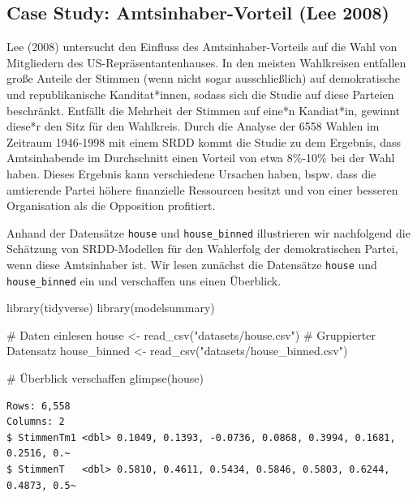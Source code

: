 \documentclass[
  a4paper,
  DIV=11,
  oneside]{scrreprt}
\newenvironment{Shaded}{\begin{snugshade}}{\end{snugshade}}
\newcommand{\CommentTok}[1]{\textcolor[rgb]{0.37,0.37,0.37}{#1}}
\newcommand{\FunctionTok}[1]{\textcolor[rgb]{0.28,0.35,0.67}{#1}}
\newcommand{\NormalTok}[1]{\textcolor[rgb]{0.00,0.23,0.31}{#1}}
\newcommand{\OtherTok}[1]{\textcolor[rgb]{0.00,0.23,0.31}{#1}}
\newcommand{\StringTok}[1]{\textcolor[rgb]{0.13,0.47,0.30}{#1}}
\begin{document}
\hypertarget{case-study-amtsinhaber-vorteil-lee2008}{%
\subsection{Case Study: Amtsinhaber-Vorteil (Lee
2008)}\label{case-study-amtsinhaber-vorteil-lee2008}}

Lee (2008) untersucht den Einfluss des Amtsinhaber-Vorteils auf die Wahl
von Mitgliedern des US-Repräsentantenhauses. In den meisten Wahlkreisen
entfallen große Anteile der Stimmen (wenn nicht sogar ausschließlich)
auf demokratische und republikanische Kanditat*innen, sodass sich die
Studie auf diese Parteien beschränkt. Entfällt die Mehrheit der Stimmen
auf eine*n Kandiat*in, gewinnt diese*r den Sitz für den Wahlkreis. Durch
die Analyse der 6558 Wahlen im Zeitraum 1946-1998 mit einem SRDD kommt
die Studie zu dem Ergebnis, dass Amtsinhabende im Durchschnitt einen
Vorteil von etwa 8\%-10\% bei der Wahl haben. Dieses Ergebnis kann
verschiedene Ursachen haben, bspw. dass die amtierende Partei höhere
finanzielle Ressourcen besitzt und von einer besseren Organisation als
die Opposition profitiert.

Anhand der Datensätze \texttt{house} und \texttt{house\_binned}
illustrieren wir nachfolgend die Schätzung von SRDD-Modellen für den
Wahlerfolg der demokratischen Partei, wenn diese Amtsinhaber ist. Wir
lesen zunächst die Datensätze \texttt{house} und \texttt{house\_binned}
ein und verschaffen uns einen Überblick.

\begin{Shaded}
\begin{Highlighting}[]
\FunctionTok{library}\NormalTok{(tidyverse)}
\FunctionTok{library}\NormalTok{(modelsummary)}

\CommentTok{\# Daten einlesen}
\NormalTok{house }\OtherTok{\textless{}{-}} \FunctionTok{read\_csv}\NormalTok{(}\StringTok{"datasets/house.csv"}\NormalTok{)}
\CommentTok{\# Gruppierter Datensatz}
\NormalTok{house\_binned }\OtherTok{\textless{}{-}} \FunctionTok{read\_csv}\NormalTok{(}\StringTok{"datasets/house\_binned.csv"}\NormalTok{)}

\CommentTok{\# Überblick verschaffen}
\FunctionTok{glimpse}\NormalTok{(house)}
\end{Highlighting}
\end{Shaded}

\begin{verbatim}
Rows: 6,558
Columns: 2
$ StimmenTm1 <dbl> 0.1049, 0.1393, -0.0736, 0.0868, 0.3994, 0.1681, 0.2516, 0.~
$ StimmenT   <dbl> 0.5810, 0.4611, 0.5434, 0.5846, 0.5803, 0.6244, 0.4873, 0.5~
\end{verbatim}
\end{document}
